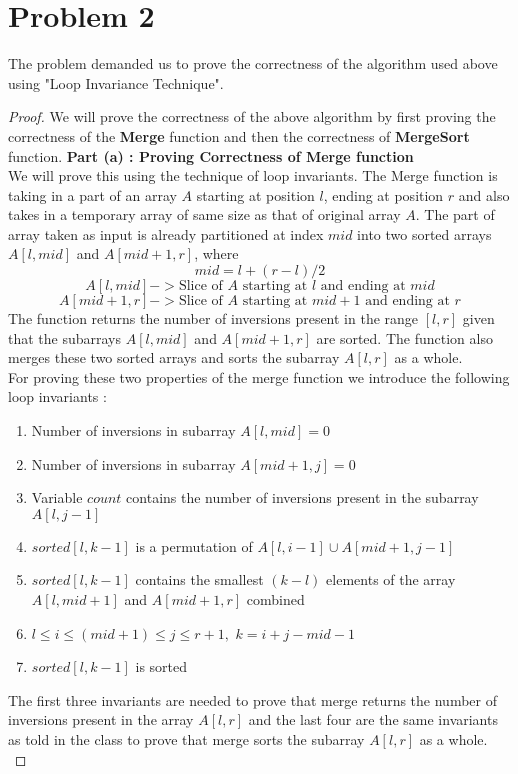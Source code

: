 \documentclass{article}
\begin{document}
\section{Problem 2}{
    The problem demanded us to prove the correctness of the algorithm used above using "Loop Invariance Technique".
    \begin {proof}
        We will prove the correctness of the above algorithm by first proving the correctness of the \textbf{Merge} function and then the correctness of \textbf{MergeSort} function. \newline \newline
        \textbf{Part (a) : Proving Correctness of Merge function} \newline \\
        We will prove this using the technique of loop invariants. The Merge function is taking in a part of an array $A$ starting at position $l$, ending at position $r$ and also takes in a temporary array of same size as that of original array $A$. The part of array taken as input is already partitioned at index $mid$ into two sorted arrays $A[l, mid]$ and $A[mid+1, r]$, where   
        \[ mid = l + (r-l)/2 \]
        \[A[l, mid] -> \text {Slice of $A$ starting at $l$ and ending at $mid$}\]
        \[A[mid + 1, r] -> \text {Slice of $A$ starting at $mid+1$ and ending at $r$}\]
        The function returns the number of inversions present in the range $[l,r]$ given that the subarrays $A[l, mid]$ and $A[mid+1, r]$ are sorted. The function also merges these two sorted arrays and sorts the subarray $A[l, r]$ as a whole. \\
        
        For proving these two properties of the merge function we introduce the following loop invariants :
        \begin{enumerate}[i]
          \item Number of inversions in subarray $A[l, mid] = 0$
          \item Number of inversions in subarray $A[mid + 1, j] = 0$
          \item Variable $count$ contains the number of inversions present in the subarray $A[l, j-1]$
          \item $sorted[l, k-1]$ is a permutation of $A[l, i-1] \cup A[mid+1, j-1]$
          \item $sorted[l,k-1]$ contains the smallest $(k-l)$ elements of the array $A[l, mid+1]$ and $A[mid+1, r]$ combined
          \item $l \leq i \leq (mid+1) \leq j \leq r+1,$ $ k = i + j - mid - 1$  
          \item $sorted[l, k-1]$ is sorted
        \end{enumerate}
        The first three invariants are needed to prove that merge returns the number of inversions present in the array $A[l, r]$ and the last four are the same invariants as told in the class to prove that merge sorts the subarray $A[l, r]$ as a whole.\\
        

\end{proof}}
\end{document}
